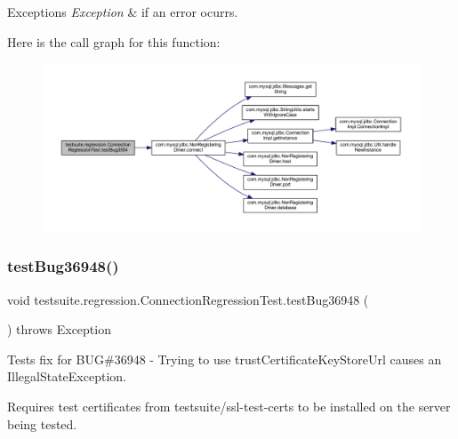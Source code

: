 \begin{DoxyExceptions}{Exceptions}
{\em Exception} & if an error ocurrs. \\
\hline
\end{DoxyExceptions}
Here is the call graph for this function\+:
\nopagebreak
\begin{figure}[H]
\begin{center}
\leavevmode
\includegraphics[width=350pt]{classtestsuite_1_1regression_1_1_connection_regression_test_a37a5b68fc2ee7b632c08744bc7579f29_cgraph}
\end{center}
\end{figure}
\mbox{\label{classtestsuite_1_1regression_1_1_connection_regression_test_a7d937c6b4d025862d519876bc472989b}} 
\subsubsection{\texorpdfstring{test\+Bug36948()}{testBug36948()}}
{\footnotesize\ttfamily void testsuite.\+regression.\+Connection\+Regression\+Test.\+test\+Bug36948 (\begin{DoxyParamCaption}{ }\end{DoxyParamCaption}) throws Exception}

Tests fix for B\+UG\#36948 -\/ Trying to use trust\+Certificate\+Key\+Store\+Url causes an Illegal\+State\+Exception.

Requires test certificates from testsuite/ssl-\/test-\/certs to be installed on the server being tested.


